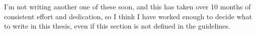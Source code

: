 

I'm not writing another one of these soon, and this has taken over 10 months of consistent effort and dedication, so I think I have worked enough to decide what to write in this thesis, even if this section is not defined in the guidelines.


